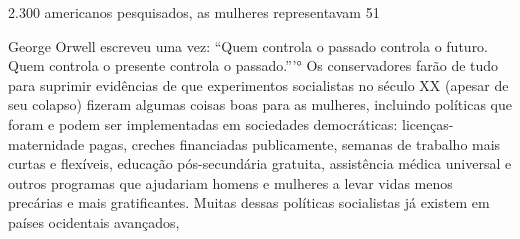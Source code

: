 2.{\color{blue}300} americanos pesquisados, as mulheres representavam 51%
 \par 
George Orwell escreveu uma vez: “Quem controla o passado controla o futuro. Quem controla o presente controla o passado.”’° Os conservadores farão de tudo para suprimir evidências de que experimentos socialistas no século XX (apesar de seu colapso) fizeram algumas coisas boas para as mulheres, incluindo políticas que foram e podem ser implementadas em sociedades democráticas: licenças-maternidade pagas, creches financiadas publicamente, semanas de trabalho mais curtas e flexíveis, educação pós-secundária gratuita, assistência médica universal e outros programas que ajudariam homens e mulheres a levar vidas menos precárias e mais gratificantes. Muitas dessas políticas socialistas já existem em países ocidentais avançados,
 \par 
